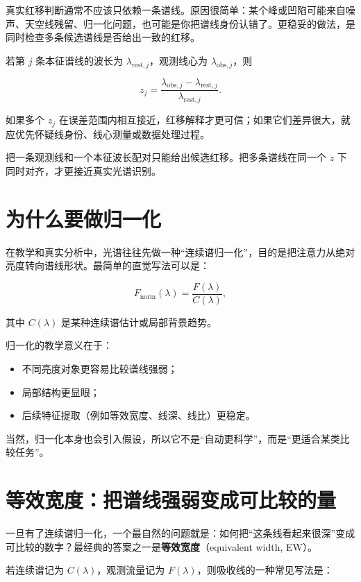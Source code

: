 真实红移判断通常不应该只依赖一条谱线。原因很简单：某个峰或凹陷可能来自噪声、天空线残留、归一化问题，也可能是你把谱线身份认错了。更稳妥的做法，是同时检查多条候选谱线是否给出一致的红移。

若第 $j$ 条本征谱线的波长为 $\lambda_{\mathrm{rest},j}$，观测线心为 $\lambda_{\mathrm{obs},j}$，则

\[
z_j = \frac{\lambda_{\mathrm{obs},j}-\lambda_{\mathrm{rest},j}}
{\lambda_{\mathrm{rest},j}}.
\]

如果多个 $z_j$ 在误差范围内相互接近，红移解释才更可信；如果它们差异很大，就应优先怀疑线身份、线心测量或数据处理过程。

\begin{protip}
把一条观测线和一个本征波长配对只能给出候选红移。把多条谱线在同一个 $z$ 下同时对齐，才更接近真实光谱识别。
\end{protip}

\section{为什么要做归一化}

在教学和真实分析中，光谱往往先做一种“连续谱归一化”，目的是把注意力从绝对亮度转向谱线形状。最简单的直觉写法可以是：

\[
F_{\mathrm{norm}}(\lambda) = \frac{F(\lambda)}{C(\lambda)},
\]

其中 $C(\lambda)$ 是某种连续谱估计或局部背景趋势。

归一化的教学意义在于：

\begin{itemize}
    \item 不同亮度对象更容易比较谱线强弱；
    \item 局部结构更显眼；
    \item 后续特征提取（例如等效宽度、线深、线比）更稳定。
\end{itemize}

当然，归一化本身也会引入假设，所以它不是“自动更科学”，而是“更适合某类比较任务”。

\section{等效宽度：把谱线强弱变成可比较的量}

一旦有了连续谱归一化，一个最自然的问题就是：如何把“这条线看起来很深”变成可比较的数字？最经典的答案之一是\textbf{等效宽度}（equivalent width, EW）。

若连续谱记为 $C(\lambda)$，观测流量记为 $F(\lambda)$，则吸收线的一种常见写法是：

